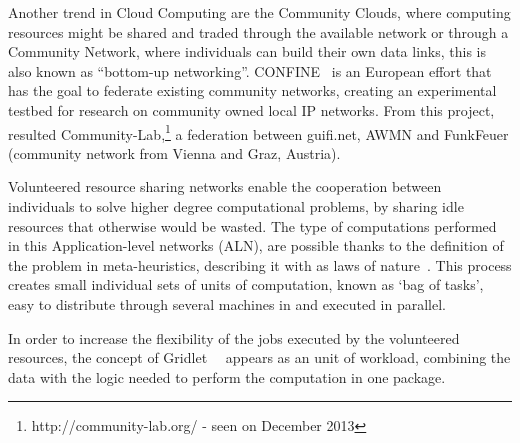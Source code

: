 Another trend in Cloud Computing are the Community Clouds, where computing resources might be shared and traded through the available network or through a Community Network, where individuals can build their own data links, this is also known as ``bottom-up networking''. CONFINE~\cite{Navarro} is an European effort that has the goal to federate existing community networks, creating an experimental testbed for research on community owned local IP networks. From this project, resulted Community-Lab,\footnote{http://community-lab.org/ - seen on December 2013} a federation between guifi.net, AWMN and FunkFeuer (community network from Vienna and Graz, Austria).

Volunteered resource sharing networks enable the cooperation between individuals to solve higher degree computational problems, by sharing idle resources that otherwise would be wasted. The type of computations performed in this Application-level networks (ALN), are possible thanks to the definition of the problem in meta-heuristics, describing it with as laws of nature~\cite{Duda2013}. This process creates small individual sets of units of computation, known as `bag of tasks', easy to distribute through several machines in and executed in parallel.

In order to increase the flexibility of the jobs executed by the volunteered resources, the concept of Gridlet~\cite{Costa2012}~\cite{Rodrigues} appears as an unit of workload, combining the data with the logic needed to perform the computation in one package.

